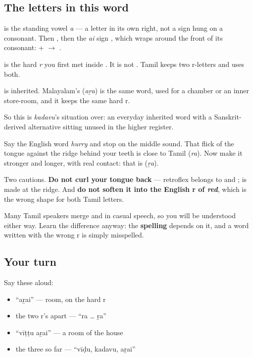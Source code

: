 \subsection*{The letters in this word}
\textbf{} is the standing vowel \emph{a} — a letter in its own right, not a sign hung on a consonant. Then \textbf{}, then the \emph{ai} sign \textbf{}, which wraps around the front of its consonant: \textbf{} + \textbf{} $\to$ \textbf{}.

\textbf{} is the hard \emph{r} you first met inside \textbf{}. It is not \textbf{}. Tamil keeps two r-letters and uses both.

\begin{cousinweb}
\textbf{} is inherited. Malayalam's \textbf{} (\emph{aṟa}) is the same word, used for a chamber or an inner store-room, and it keeps the same hard r.

So this is \emph{kadavu}'s situation over: an everyday inherited word with a Sanskrit-derived alternative sitting unused in the higher register.
\end{cousinweb}

\begin{sounds}
Say the English word \emph{hurry} and stop on the middle sound. That flick of the tongue against the ridge behind your teeth is close to Tamil \textbf{} (\emph{ra}). Now make it stronger and longer, with real contact: that is \textbf{} (\emph{ṟa}).

Two cautions. \textbf{Do not curl your tongue back} — retroflex belongs to \textbf{} and \textbf{}; \textbf{} is made at the ridge. And \textbf{do not soften it into the English r of \emph{red}}, which is the wrong shape for both Tamil letters.

Many Tamil speakers merge \textbf{} and \textbf{} in casual speech, so you will be understood either way. Learn the difference anyway: the \textbf{spelling} depends on it, and a word written with the wrong r is simply misspelled.
\end{sounds}

\subsection*{Your turn}
Say these aloud:

\begin{itemize}
\raggedright
  \item \textquotedblleft{}aṟai\textquotedblright{} — room, on the hard r
  \item the two r's apart — \textquotedblleft{}ra … ṟa\textquotedblright{}
  \item \textquotedblleft{}vīṭṭu aṟai\textquotedblright{} — a room of the house
  \item the three so far — \textquotedblleft{}vīḍu, kadavu, aṟai\textquotedblright{}
\end{itemize}

